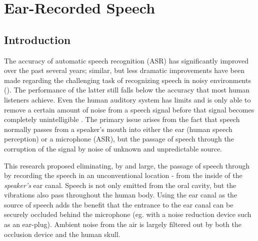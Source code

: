 % 
% 
% 



\chapter{Ear-Recorded Speech\label{chapter2}}


\section{Introduction}

The accuracy of automatic speech recognition (ASR) has significantly improved over the past several years; similar, but less dramatic improvements have been made regarding the challenging task of recognizing speech in noisy environments (\cite{zhang:17}).  The performance of the latter still falls below the accuracy that most human listeners achieve.  Even \DIFdelbegin {}\DIFdelend the human auditory system has limits and is only able to remove a certain amount of noise from a speech signal before that signal becomes completely unintelligible \DIFaddbegin {}\DIFaddend .  The primary issue arises from the fact that speech normally passes from a speaker's mouth into either the ear (human speech perception) or a microphone (ASR), but the passage of speech through the \DIFdelbegin {}\DIFdelend \DIFaddbegin {}\DIFaddend corruption of the signal by noise of unknown \DIFdelbegin {}\DIFdelend \DIFaddbegin {}\DIFaddend and unpredictable source.  

This research proposed eliminating, by and large, the passage of speech through \DIFdelbegin {}\DIFdelend \DIFaddbegin {}\DIFaddend by recording the speech in an unconventional location - from the inside of the \textit{speaker's} ear canal.  Speech is not only emitted from the oral cavity, but the vibrations also pass throughout the human body.  Using the ear canal as the source of speech adds the benefit that the entrance to the ear canal can be securely occluded behind the microphone (eg. with a noise reduction device such as an ear-plug).  Ambient noise from the air is largely filtered out by both the occlusion device and the human skull.

